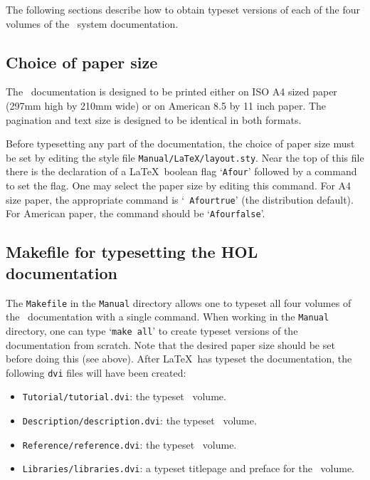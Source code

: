 The following sections describe how to obtain typeset versions of each of the
four volumes of the \HOL\ system documentation.

\subsection{Choice of paper size}

The \HOL\ documentation is designed to be printed either on ISO A4 sized
paper (297mm high by 210mm wide) or on American 8.5 by 11 inch paper. The
pagination and text size is designed to be identical in both formats.

Before typesetting any part of the documentation, the choice of paper size must
be set by editing the style file {\tt Manual/LaTeX/layout.sty}.  Near the top
of this file there is the declaration of a \LaTeX\ boolean flag `{\tt Afour}'
followed by a command to set the flag. One may select the paper size by editing
this command.  For A4 size paper, the appropriate command is `{\tt \bk
Afourtrue}' (the distribution default).  For American paper, the command should
be `{\tt \bk Afourfalse}'.

\subsection{Makefile for typesetting the HOL documentation}

The {\tt Makefile} in the {\tt Manual} directory allows one to typeset all four
volumes of the \HOL\ documentation with a single command. When working in the
{\tt Manual} directory, one can type `{\tt make all}' to create typeset
versions of the documentation from scratch.  Note that the desired paper size
should be set before doing this (see above).  After \LaTeX\ has typeset the
documentation, the following {\tt dvi} files will have been created:

\begin{itemize}

\item {\tt Tutorial/tutorial.dvi}: the typeset \TUTORIAL\ volume.

\item {\tt Description/description.dvi}: the typeset \DESCRIPTION\ volume.

\item {\tt Reference/reference.dvi}: the typeset \REFERENCE\ volume.

\item {\tt Libraries/libraries.dvi}: a typeset titlepage and preface for the
\LIBRARIES\ volume.

\end{itemize}

